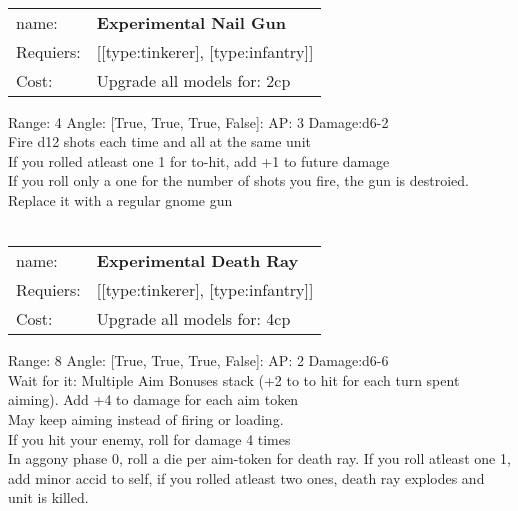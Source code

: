 \ \\
\begin{tabular}{ll}
name: & {\bf Experimental Nail Gun } \\
Requiers: & [[type:tinkerer], [type:infantry]] \\
Cost: & Upgrade all models for: 2cp \\
\end{tabular}



Range: 4  Angle: [True, True, True, False]: AP: 3 Damage:d6-2 \\
Fire d12 shots each time and all at the same unit\\ 
If you rolled atleast one 1 for to-hit, add +1 to future damage\\ 
If you roll only a one for the number of shots you fire, the gun is destroied. Replace it with a regular gnome gun\\ 








\ \\
\begin{tabular}{ll}
name: & {\bf Experimental Death Ray } \\
Requiers: & [[type:tinkerer], [type:infantry]] \\
Cost: & Upgrade all models for: 4cp \\
\end{tabular}



Range: 8  Angle: [True, True, True, False]: AP: 2 Damage:d6-6 \\
Wait for it: Multiple Aim Bonuses stack (+2 to to hit for each turn spent aiming). Add +4 to damage for each aim token\\ 
May keep aiming instead of firing or loading.\\ 
If you hit your enemy, roll for damage 4 times\\ 
In aggony phase 0, roll a die per aim-token for death ray. If you roll atleast one 1, add minor accid to self, if you rolled atleast two ones, death ray explodes and unit is killed.\\ 








